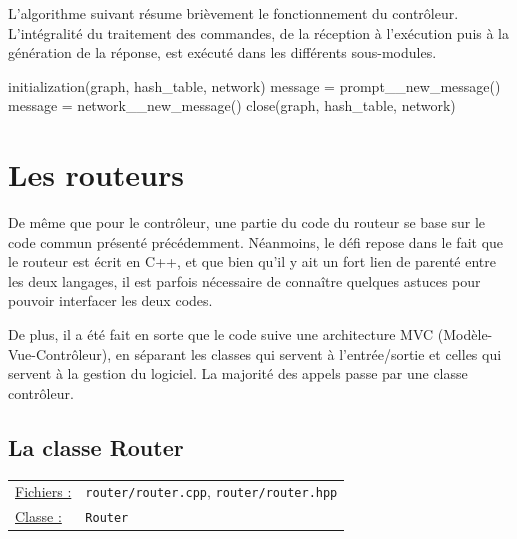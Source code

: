 \documentclass[a4paper,11pt]{article}
\begin{document}
L'algorithme suivant résume brièvement le fonctionnement du contrôleur. L'intégralité du traitement des commandes, de la réception à l'exécution puis à la génération de la réponse, est exécuté dans les différents sous-modules.
\\
\begin{algorithm}[H]
 initialization(graph, hash\_table, network)\;
  {
 	message = prompt\_\_new\_message()\;
 	\BlankLine
 	message = network\_\_new\_message()\;
 	\BlankLine
 }
 close(graph, hash\_table, network)\;
\end{algorithm}

\section{Les routeurs} %

De même que pour le contrôleur, une partie du code du routeur se base sur le code commun présenté précédemment. Néanmoins, le défi repose dans le fait que le routeur est écrit en C++, et que bien qu'il y ait un fort lien de parenté entre les deux langages, il est parfois nécessaire de connaître quelques astuces pour pouvoir interfacer les deux codes.

De plus, il a été fait en sorte que le code suive une architecture MVC (Modèle-Vue-Contrôleur), en séparant les classes qui servent
à l'entrée/sortie et celles qui servent à la gestion du logiciel. La majorité des appels passe par une classe contrôleur.

\subsection{La classe Router}

\begin{tabularx}{\linewidth}{lX}
\underline{Fichiers :} & \texttt{router/router.cpp}, \texttt{router/router.hpp}\\
\underline{Classe :} & \texttt{Router}\\
\end{tabularx}\\
\end{document}
